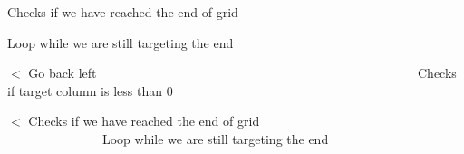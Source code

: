 Checks if we have reached the end of grid

Loop while we are still targeting the end

$<$ Go back left ~\newline
~\newline
~\newline
~\newline
~\newline
~\newline
~\newline
~\newline
~\newline
~\newline
~\newline
~\newline
~\newline
~\newline
~\newline
~\newline
~\newline
~\newline
~\newline
~\newline
~\newline
~\newline
~\newline
~\newline
~\newline
~\newline
~\newline
~\newline
~\newline
~\newline
 Checks if target column is less than 0

$<$ Checks if we have reached the end of grid ~\newline
~\newline
~\newline
~\newline
~\newline
~\newline
~\newline
~\newline
~\newline
~\newline
~\newline
~\newline
~\newline
~\newline
~\newline
~\newline
~\newline
~\newline
~\newline
~\newline
~\newline
~\newline
~\newline
~\newline
~\newline
~\newline
~\newline
~\newline
 Loop while we are still targeting the end

